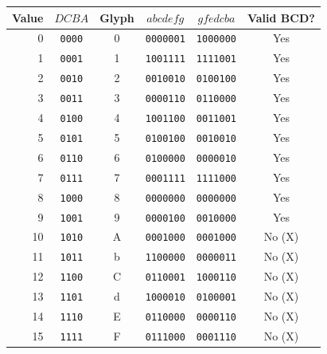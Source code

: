 \documentclass[a4paper,11pt]{article}
\begin{document}
\begin{center}\small
\begin{tabular}{rccccc}
\toprule
Value & $DCBA$ & Glyph & $abcdefg$ & $gfedcba$ & Valid BCD?\\\midrule
0 & \texttt{0000} & 0 & \texttt{0000001} & \texttt{1000000} & Yes\\
1 & \texttt{0001} & 1 & \texttt{1001111} & \texttt{1111001} & Yes\\
2 & \texttt{0010} & 2 & \texttt{0010010} & \texttt{0100100} & Yes\\
3 & \texttt{0011} & 3 & \texttt{0000110} & \texttt{0110000} & Yes\\
4 & \texttt{0100} & 4 & \texttt{1001100} & \texttt{0011001} & Yes\\
5 & \texttt{0101} & 5 & \texttt{0100100} & \texttt{0010010} & Yes\\
6 & \texttt{0110} & 6 & \texttt{0100000} & \texttt{0000010} & Yes\\
7 & \texttt{0111} & 7 & \texttt{0001111} & \texttt{1111000} & Yes\\
8 & \texttt{1000} & 8 & \texttt{0000000} & \texttt{0000000} & Yes\\
9 & \texttt{1001} & 9 & \texttt{0000100} & \texttt{0010000} & Yes\\
10 & \texttt{1010} & A & \texttt{0001000} & \texttt{0001000} & No (X)\\
11 & \texttt{1011} & b & \texttt{1100000} & \texttt{0000011} & No (X)\\
12 & \texttt{1100} & C & \texttt{0110001} & \texttt{1000110} & No (X)\\
13 & \texttt{1101} & d & \texttt{1000010} & \texttt{0100001} & No (X)\\
14 & \texttt{1110} & E & \texttt{0110000} & \texttt{0000110} & No (X)\\
15 & \texttt{1111} & F & \texttt{0111000} & \texttt{0001110} & No (X)\\
\bottomrule\end{tabular}\end{center}
\end{document}
